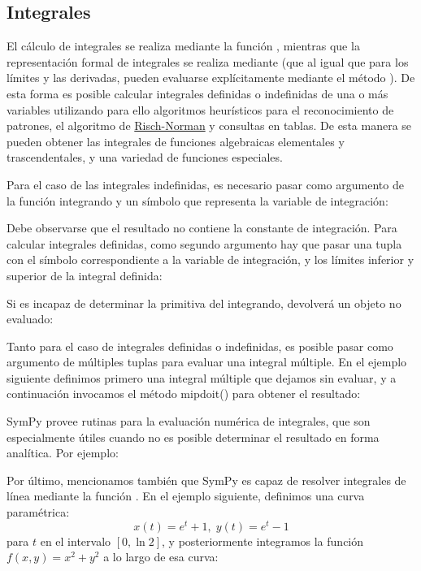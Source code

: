 \subsection{Integrales}
El cálculo de integrales se realiza mediante la función , mientras que la representación formal de integrales se realiza mediante  (que al igual que para los límites y las derivadas, pueden evaluarse explícitamente mediante el método ). De esta forma es posible calcular integrales definidas o indefinidas de una o más variables utilizando para ello algoritmos heurísticos para el reconocimiento de patrones, el algoritmo de \href{https://es.wikipedia.org/wiki/Algoritmo_de_Risch}{Risch-Norman} y consultas en tablas. De esta manera se pueden obtener las integrales de funciones algebraicas elementales y trascendentales, y una variedad de funciones especiales.

Para el caso de las integrales indefinidas, es necesario pasar como argumento de  la función integrando y un símbolo que representa la variable de integración:

Debe observarse que el resultado no contiene la constante de integración. Para calcular integrales definidas, como segundo argumento hay que pasar una tupla con el símbolo correspondiente a la variable de integración, y los límites inferior y superior de la integral definida:

Si  es incapaz de determinar la primitiva del integrando, devolverá un objeto  no evaluado:

Tanto para el caso de integrales definidas o indefinidas, es posible pasar como argumento de  múltiples tuplas para evaluar una integral múltiple. En el ejemplo siguiente definimos primero una integral múltiple que dejamos sin evaluar, y a continuación invocamos el método mip{doit()} para obtener el resultado:

SymPy provee rutinas para la evaluación numérica de integrales, que son especialmente útiles cuando no es posible determinar el resultado en forma analítica. Por ejemplo:

Por último, mencionamos también que SymPy es capaz de resolver integrales de línea mediante la función . En el ejemplo siguiente, definimos una curva paramétrica:
\[ x(t) = e^t + 1, \; y(t) = e^t - 1 \]
para $t$ en el intervalo $[0, \ln 2]$, y posteriormente integramos la función $f(x, y) = x^2 + y^2$ a lo largo de esa curva:


